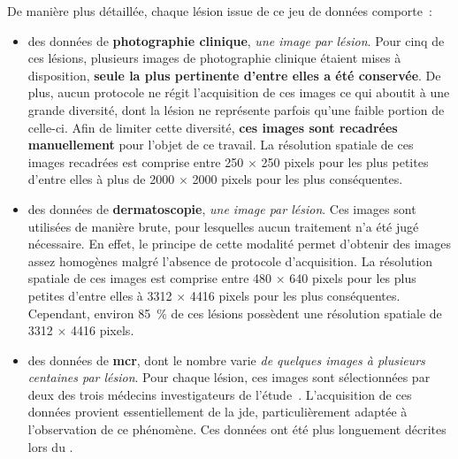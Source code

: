 De manière plus détaillée, chaque lésion issue de ce jeu de données comporte~:
\begin{itemize}
    \item des données de \textbf{photographie clinique}, \textit{une image par lésion}. Pour cinq de ces lésions, plusieurs images de photographie clinique étaient mises à disposition, \textbf{seule la plus pertinente d'entre elles a été conservée}. De plus, aucun protocole ne régit l'acquisition de ces images ce qui aboutit à une grande diversité, dont la lésion ne représente parfois qu'une faible portion de celle-ci. Afin de limiter cette diversité, \textbf{ces images sont recadrées manuellement} pour l'objet de ce travail. La résolution spatiale de ces images recadrées est comprise entre 250 $\times$ 250 pixels pour les plus petites d'entre elles à plus de 2000 $\times$ 2000 pixels pour les plus conséquentes.
    \item des données de \textbf{dermatoscopie}, \textit{une image par lésion}. Ces images sont utilisées de manière brute, pour lesquelles aucun traitement n'a été jugé nécessaire. En effet, le principe de cette modalité permet d'obtenir des images assez homogènes malgré l'absence de protocole d'acquisition. La résolution spatiale de ces images est comprise entre 480 $\times$ 640 pixels pour les plus petites d'entre elles à 3312 $\times$ 4416 pixels pour les plus conséquentes. Cependant, environ 85~\% de ces lésions possèdent une résolution spatiale de 3312 $\times$ 4416 pixels.
    \item des données de \textbf{\gls{mcr}}, dont le nombre varie \textit{de quelques images à plusieurs centaines par lésion}. Pour chaque lésion, ces images sont sélectionnées par deux des trois médecins investigateurs de l'étude~\cite{Cinotti2018}. L'acquisition de ces données provient essentiellement de la \gls{jde}, particulièrement adaptée à l'observation de ce phénomène. Ces données ont été plus longuement décrites lors du .
\end{itemize}\par

